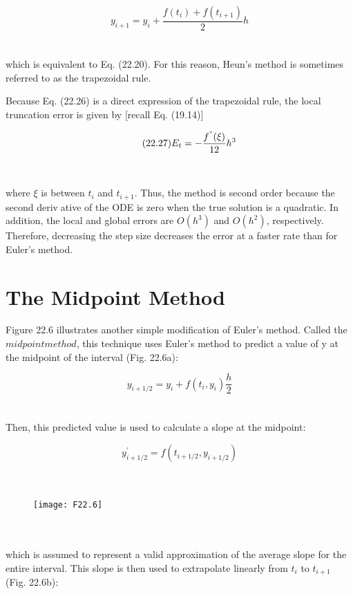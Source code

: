 \begin{equation}
\tag{22.26}
y_{i+1} = y_{i} + \dfrac{f(t_{i}) + f(t_{i+1}) }{2}h
\end{equation}\\
\\
which is equivalent to Eq. (22.20). For this reason, Heun’s method is sometimes referred to
as the trapezoidal rule.

Because Eq. (22.26) is a direct expression of the trapezoidal rule, the local truncation
error is given by [recall Eq. (19.14)]

\begin{equation}
\tag{22.27}
E_{t} = - \dfrac{f^{"}(\xi)}{12} h^3
\end{equation}\\
\\
where $\xi$ is between $t_{i}$ and $t_{i+1}$. Thus, the method is second order because the second derivative of the ODE is zero when the true solution is a quadratic. In addition, the local and
global errors are $O(h^3)$ and $O(h^2)$, respectively. Therefore, decreasing the step size
decreases the error at a faster rate than for Euler’s method.

\section{The Midpoint Method}

Figure 22.6 illustrates another simple modification of Euler’s method. Called the $midpoint method$, this technique uses Euler’s method to predict a value of y at the midpoint of the
interval (Fig. 22.6a):

\begin{equation}
\tag{22.28}
y_{i+1/2} = y_{i} + f(t_{i},y_{i})\dfrac{h}{2}
\end{equation}\\
\\
Then, this predicted value is used to calculate a slope at the midpoint:

\begin{equation}
\tag{22.29}
y^{'}_{i+1/2} = f( t_{i+1/2}, y_{i+1/2} )
\end{equation}\\
\\
\begin{figure}[hbt!]
	\texttt{[image: F22.6]}
	\label{F22.6}
\end{figure}\\
\\
which is assumed to represent a valid approximation of the average slope for the entire
interval. This slope is then used to extrapolate linearly from $t_{i}$ to $t_{i+1}$ (Fig. 22.6b):

